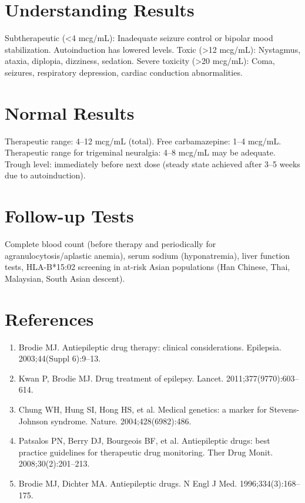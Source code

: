 \section*{Understanding Results}
Subtherapeutic (<4 mcg/mL): Inadequate seizure control or bipolar mood stabilization. Autoinduction has lowered levels. Toxic (>12 mcg/mL): Nystagmus, ataxia, diplopia, dizziness, sedation. Severe toxicity (>20 mcg/mL): Coma, seizures, respiratory depression, cardiac conduction abnormalities.
\section*{Normal Results}
Therapeutic range: 4--12 mcg/mL (total). Free carbamazepine: 1--4 mcg/mL. Therapeutic range for trigeminal neuralgia: 4--8 mcg/mL may be adequate. Trough level: immediately before next dose (steady state achieved after 3--5 weeks due to autoinduction).
\section*{Follow-up Tests}
Complete blood count (before therapy and periodically for agranulocytosis/aplastic anemia), serum sodium (hyponatremia), liver function tests, HLA-B*15:02 screening in at-risk Asian populations (Han Chinese, Thai, Malaysian, South Asian descent).
\section*{References}
\begin{enumerate}
  \item Brodie MJ. Antiepileptic drug therapy: clinical considerations. Epilepsia. 2003;44(Suppl 6):9--13.
  \item Kwan P, Brodie MJ. Drug treatment of epilepsy. Lancet. 2011;377(9770):603--614.
  \item Chung WH, Hung SI, Hong HS, et al. Medical genetics: a marker for Stevens-Johnson syndrome. Nature. 2004;428(6982):486.
  \item Patsalos PN, Berry DJ, Bourgeois BF, et al. Antiepileptic drugs: best practice guidelines for therapeutic drug monitoring. Ther Drug Monit. 2008;30(2):201--213.
  \item Brodie MJ, Dichter MA. Antiepileptic drugs. N Engl J Med. 1996;334(3):168--175.
\end{enumerate}
\clearpage

